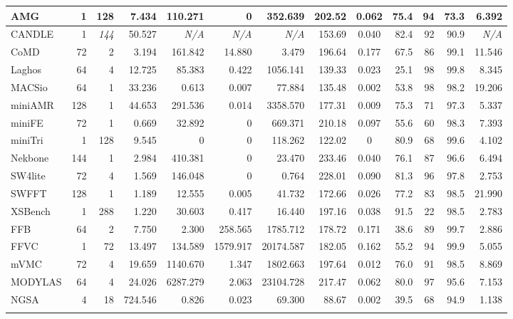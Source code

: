 \begin{table*}[tbp]
\begin{tabular}{|l|r|r|r|r|r|r|r|c|r|r|r|r|}
        AMG	        &	1	&	128	&	7.434	&	110.271	&	0	&	352.639	&	202.52	&	0.062	&	75.4	&	94	&   73.3	&	6.392	\\ \hline \rC
        CANDLE	    &	1	&	\textit{144}	&	50.527	&	\textit{N/A}	&	\textit{N/A}	&	\textit{N/A}	&	153.69	&	0.040	&	82.4	&	92	&	90.9	&	\textit{N/A}	\\ \hline
        CoMD	    &	72	&	2	&	3.194	&	161.842	&	14.880	&	3.479	&	196.64	&	0.177	&	67.5	&	86	&	99.1	&	11.546	\\ \hline \rC
        Laghos	    &	64	&	4	&	12.725	&	85.383	&	0.422	&	1056.141	&	139.33	&	0.023	&	25.1	&	98	&	99.8	&	8.345	\\ \hline
        MACSio	    &	64	&	1	&	33.236	&	0.613	&	0.007	&	77.884	&	135.48	&	0.002	&	53.8	&	98	&	98.2	&	19.206	\\ \hline \rC
        miniAMR	    &	128	&	1	&	44.653	&	291.536	&	0.014	&	3358.570	&	177.31	&	0.009	&	75.3	&	71	&	97.3	&	5.337	\\ \hline
        miniFE	    &	72	&	1	&	0.669	&	32.892	&	0	&	669.371	&	210.18	&	0.097	&	55.6	&	60	&	98.3	&	7.393	\\ \hline \rC
        miniTri	    &	1	&	128	&	9.545	&	0	&	0	&	118.262	&	122.02	&	0	&	80.9	&	68	&	99.6	&	4.102	\\ \hline
        Nekbone	    &	144	&	1	&	2.984	&	410.381	&	0	&	23.470	&	233.46	&	0.040	&	76.1	&	87	&	96.6	&	6.494	\\ \hline \rC
        SW4lite	    &	72	&	4	&	1.569	&	146.048	&	0	&	0.764	&	228.01	&	0.090	&	81.3	&	96	&	97.8	&	2.753	\\ \hline
        SWFFT	    &	128	&	1	&	1.189	&	12.555	&	0.005	&	41.732	&	172.66	&	0.026	&	77.2	&	83	&	98.5	&	21.990	\\ \hline \rC
        XSBench	    &	1	&	288	&	1.220	&	30.603	&	0.417	&	16.440	&	197.16	&	0.038	&	91.5	&	22	&	98.5	&	2.783	\\ \hline\hline
        FFB	        &	64	&	2	&	7.750	&	2.300	&	258.565	&	1785.712	&	178.72	&	0.171	&	38.6	&	89	&	99.7	&	2.886	\\ \hline \rC
        FFVC	    &	1	&	72	&	13.497	&	134.589	&	1579.917	&	20174.587	&	182.05	&	0.162	&	55.2	&	94	&	99.9	&	5.055	\\ \hline
        mVMC	    &	72	&	4	&	19.659	&	1140.670	&	1.347	&	1802.663	&	197.64	&	0.012	&	76.0	&	91	&	98.5	&	8.869	\\ \hline \rC
        MODYLAS	    &	64	&	4	&	24.026	&	6287.279	&	2.063	&	23104.728	&	217.47	&	0.062	&	80.0	&	97	&	95.6	&	7.153	\\ \hline
        NGSA	    &	4	&	18	&	724.546	&	0.826	&	0.023	&	69.300	&	88.67	&	0.002	&	39.5	&	68	&	94.9	&	1.138	\\ \hline \rC

\end{tabular}
\end{table*}
